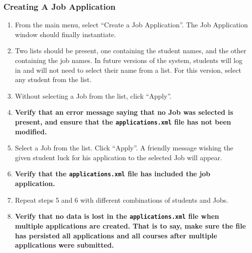 \documentclass[12pt]{report}
\begin{document}
\subsubsection{Creating A Job Application}
\begin{enumerate}
	\item From the main menu, select ``Create a Job Application''. The Job Application window should
		finally instantiate.
	\item Two lists should be present, one containing the student names, and the other containing
		the job names. In future versions of the system, students will log in and will not need to
		select their name from a list. For this version, select any student from the list.
	\item Without selecting a Job from the list, click ``Apply''.
	\item \textbf{Verify that an error message saying that no Job was selected is present, and
			ensure that the \texttt{applications.xml} file has not been modified.}
	\item Select a Job from the list. Click ``Apply''. A friendly message wishing the given student
		luck for his application to the selected Job will appear.
	\item \textbf{Verify that the \texttt{applications.xml} file has included the job application.}
	\item Repeat steps 5 and 6 with different combinations of students and Jobs.
	\item \textbf{Verify that no data is lost in the \texttt{applications.xml} file when multiple
		applications are created. That is to say, make sure the file has persisted all applications and
	all courses after multiple applications were submitted.}
\end{enumerate}
\end{document}
